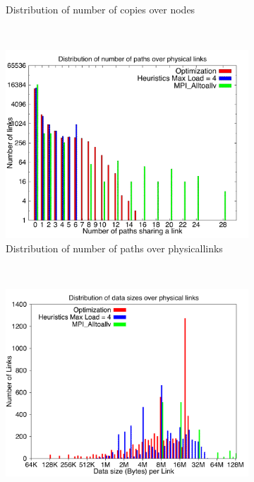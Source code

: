 \begin{figure}[!htbp]
\begin{subfigure}[b]{0.49\textwidth}
                \caption{Distribution of number of copies over nodes}
                \label{fig:27_2048_copy}
        \end{subfigure}
        ~ %
        \begin{subfigure}[b]{0.49\textwidth}
                \includegraphics[width=\textwidth]{report_figures/constantr/27_2048/loadpath_histo.pdf}
                \caption{Distribution of number of paths over physicallinks}
                \label{fig:27_2048_loadpath}
        \end{subfigure}
        ~ %
        \begin{subfigure}[b]{0.49\textwidth}
                \includegraphics[width=\textwidth]{report_figures/constantr/27_2048/loaddata_histo.pdf}

\end{subfigure}
\end{figure}
